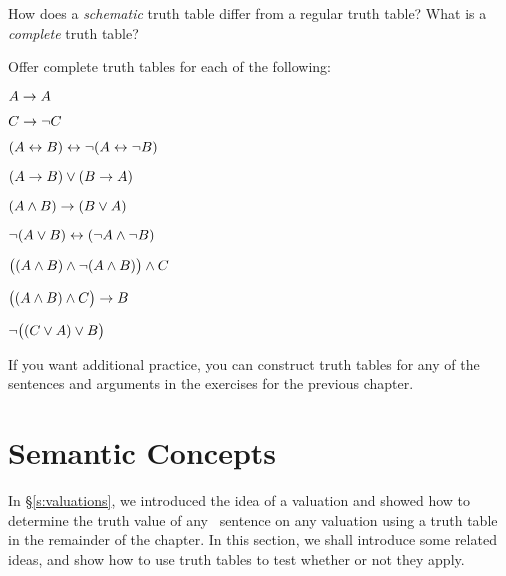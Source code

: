 

\label{pr.TT.TTorC.p}\practiceproblems
\problempart
How does a \emph{schematic} truth table differ from a regular truth table? What is a \emph{complete} truth table?

\problempart\label{pr.TT.TTorC}
Offer complete truth tables for each of the following: 
\begin{earg}
\item $A \rightarrow A$ %
\item $C \rightarrow\neg C$ %
\item $(A \leftrightarrow B) \leftrightarrow \neg(A\leftrightarrow \neg B)$ %
\item $(A \rightarrow B) \vee (B \rightarrow A)$ %
\item $(A \wedge B) \rightarrow (B \vee A)$  %
\item $\neg(A \vee B) \leftrightarrow (\neg A \wedge \neg B)$ %
\item $\bigl( (A\wedge B) \wedge\neg(A\wedge B) \bigr) \wedge C$ %
\item $\bigl( (A \wedge B) \wedge C\bigr) \rightarrow B$ %
\item $\neg\bigl( (C\vee A) \vee B\bigr)$ %
\end{earg}

If you want additional practice, you can construct truth tables for any of the sentences and arguments in the exercises for the previous chapter.


\chapter{Semantic Concepts}\label{s:Semantic.concepts}
In §\ref{s:valuations}, we introduced the idea of a valuation and showed how to determine the truth value of any \TFL\ sentence on any valuation using a truth table in the remainder of the chapter. In this section, we shall introduce some related ideas, and show how to use truth tables to test whether or not they apply.



